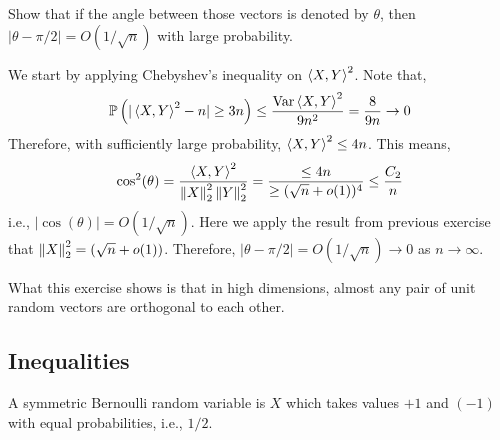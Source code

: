 \documentclass[12pt]{article}
\begin{document}
\begin{exercisebox}[(Continued)]
    Show that if the angle between those vectors is denoted by $\theta$, then $\vert \theta - \pi/2\vert = O(1/\sqrt{n})$ with large probability.

    We start by applying Chebyshev's inequality on $\left\langle X,Y \right\rangle^2$. Note that,
    \begin{equation*}
        \mathbb{P}\left( \vert \left\langle X,Y \right\rangle^2 - n\vert \geq 3n \right) \leq \dfrac{\mathrm{Var}\left\langle X,Y \right\rangle^2}{9n^2} = \dfrac{8}{9n} \rightarrow 0
    \end{equation*}
    \noindent Therefore, with sufficiently large probability, $\left\langle X,Y \right\rangle^2 \leq 4n$. This means,
    \begin{equation*}
        \cos^2(\theta) = \dfrac{\left\langle X,Y \right\rangle^2}{\left\Vert X \right\Vert_2^2 \left\Vert Y \right\Vert_2^2} = \dfrac{\leq 4n}{\geq (\sqrt{n} + o(1))^4} \leq \dfrac{C_2}{n}
    \end{equation*}
    \noindent i.e., $\vert \cos(\theta)\vert = O(1/\sqrt{n})$. Here we apply the result from previous exercise that $\left\Vert X \right\Vert_2^2 = (\sqrt{n}+o(1))$. Therefore, $\vert \theta - \pi/2\vert = O(1/\sqrt{n}) \rightarrow 0$ as $n \rightarrow \infty$.
\end{exercisebox}

What this exercise shows is that in high dimensions, almost any pair of unit random vectors are orthogonal to each other.


\subsection{Inequalities}

\begin{definitionbox}
    A symmetric Bernoulli random variable is $X$ which takes values $+1$ and $(-1)$ with equal probabilities, i.e., $1/2$.
\end{definitionbox}
\end{document}
